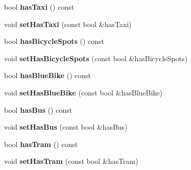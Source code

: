 \begin{DoxyCompactItemize}
\item 
\mbox{\label{classStationEngine_1_1Station_a898d71b83cb5deca0f024cbef343c373}} 
bool {\bfseries has\+Taxi} () const
\item 
\mbox{\label{classStationEngine_1_1Station_a50c9fcc45a2f96e58e1058ab6b723dc0}} 
void {\bfseries set\+Has\+Taxi} (const bool \&has\+Taxi)
\item 
\mbox{\label{classStationEngine_1_1Station_adce0ee13730ec3e93866854af6e9048a}} 
bool {\bfseries has\+Bicycle\+Spots} () const
\item 
\mbox{\label{classStationEngine_1_1Station_ac6859b73232d1d6d185fdfe5a6426da7}} 
void {\bfseries set\+Has\+Bicycle\+Spots} (const bool \&has\+Bicycle\+Spots)
\item 
\mbox{\label{classStationEngine_1_1Station_a9c710a576b7834006ab714a3f298c6e6}} 
bool {\bfseries has\+Blue\+Bike} () const
\item 
\mbox{\label{classStationEngine_1_1Station_a9a0738e9df95033eef7b88a1abb1e1cb}} 
void {\bfseries set\+Has\+Blue\+Bike} (const bool \&has\+Blue\+Bike)
\item 
\mbox{\label{classStationEngine_1_1Station_ab373623fb7c16bd0e4de09a2c8ab3fed}} 
bool {\bfseries has\+Bus} () const
\item 
\mbox{\label{classStationEngine_1_1Station_a21d3d32a85308ceecfa4588fab2d50d0}} 
void {\bfseries set\+Has\+Bus} (const bool \&has\+Bus)
\item 
\mbox{\label{classStationEngine_1_1Station_a18cc82bbb307cdc0f1ef6db28a664fe5}} 
bool {\bfseries has\+Tram} () const
\item 
\mbox{\label{classStationEngine_1_1Station_ac60188d8fd67689dbda07bd24391ea65}} 
void {\bfseries set\+Has\+Tram} (const bool \&has\+Tram)
\item 
\mbox{\label{classStationEngine_1_1Station_ae3bfe0ae7f6c042e199c0d5a6e2dd669}} 

\end{DoxyCompactItemize}
